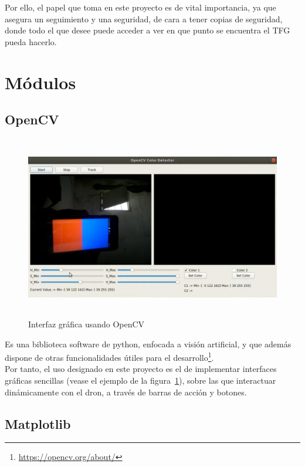Por ello, el papel que toma en este proyecto es de vital importancia, ya que asegura un seguimiento y una seguridad, de cara a tener copias de seguridad, donde todo el que desee puede acceder a ver en que punto se encuentra el \ac{TFG} pueda hacerlo.\\

\section{Módulos}
\label{sec:modulos}

\subsection{OpenCV}
\label{subsec:opencv}

\begin{figure} [t]
	\begin{center}
	\includegraphics[height=8cm]{imagenes/cap3/5_opencv_example.png}
	\end{center}
	\caption[Interfaz gráfica usando OpenCV]{Interfaz gráfica usando OpenCV}
	\label{fig:opencv}
\end{figure}

Es una biblioteca software de python, enfocada a visión artificial, y que además dispone de otras funcionalidades útiles para el desarrollo\footnote[11]{\url{https://opencv.org/about/}}.\\

Por tanto, el uso designado en este proyecto es el de implementar interfaces gráficas sencillas (vease el ejemplo de la figura~\ref{fig:opencv}), sobre las que interactuar dinámicamente con el dron, a través de barras de acción y botones.

\subsection{Matplotlib}
\label{subsec:matplotlib}

